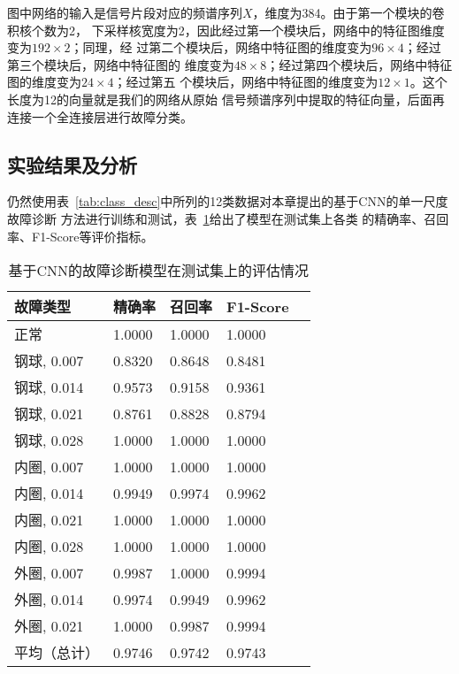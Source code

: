 图中网络的输入是信号片段对应的频谱序列$X$，维度为384。由于第一个模块的卷积核个数为2，
下采样核宽度为2，因此经过第一个模块后，网络中的特征图维度变为$192\times 2$；同理，经
过第二个模块后，网络中特征图的维度变为$96\times 4$；经过第三个模块后，网络中特征图的
维度变为$48\times 8$；经过第四个模块后，网络中特征图的维度变为$24\times 4$；经过第五
个模块后，网络中特征图的维度变为$12\times 1$。这个长度为12的向量就是我们的网络从原始
信号频谱序列中提取的特征向量，后面再连接一个全连接层进行故障分类。

\subsection{实验结果及分析}

仍然使用表~\ref{tab:class_desc}中所列的12类数据对本章提出的基于CNN的单一尺度故障诊断
方法进行训练和测试，表~\ref{tab:chap3:classification_report}给出了模型在测试集上各类
的精确率、召回率、F1-Score等评价指标。
\begin{table}[htb]
  \centering
  \begin{minipage}[t]{0.8\linewidth}
  \caption{基于CNN的故障诊断模型在测试集上的评估情况}
  \label{tab:chap3:classification_report}
    \begin{tabularx}{\linewidth}{XXXXX}
      \toprule[1.5pt]
        故障类型    & 精确率 & 召回率 & F1-Score \\
      \midrule[1pt]
        正常        & 1.0000 & 1.0000 & 1.0000 \\
        钢球, 0.007 & 0.8320 & 0.8648 & 0.8481 \\
        钢球, 0.014 & 0.9573 & 0.9158 & 0.9361 \\
        钢球, 0.021 & 0.8761 & 0.8828 & 0.8794 \\
        钢球, 0.028 & 1.0000 & 1.0000 & 1.0000 \\
        内圈, 0.007 & 1.0000 & 1.0000 & 1.0000 \\
        内圈, 0.014 & 0.9949 & 0.9974 & 0.9962 \\
        内圈, 0.021 & 1.0000 & 1.0000 & 1.0000 \\
        内圈, 0.028 & 1.0000 & 1.0000 & 1.0000 \\
        外圈, 0.007 & 0.9987 & 1.0000 & 0.9994 \\
        外圈, 0.014 & 0.9974 & 0.9949 & 0.9962 \\
        外圈, 0.021 & 1.0000 & 0.9987 & 0.9994 \\
      \midrule[1pt]
        平均（总计）& 0.9746 & 0.9742 & 0.9743 \\
      \bottomrule[1.5pt]
    \end{tabularx}
  \end{minipage}
\end{table}

